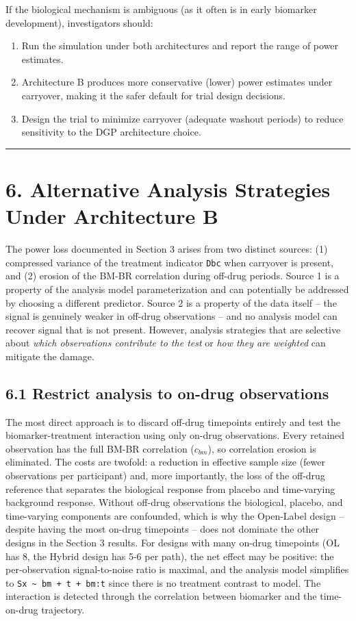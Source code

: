 \documentclass[
]{article}
\begin{document}
If the biological mechanism is ambiguous (as it often is in early
biomarker development), investigators should:

\begin{enumerate}
\item Run the simulation under both architectures and report the
  range of power estimates.
\item Architecture B produces more conservative (lower)
  power estimates under carryover, making it the safer default
  for trial design decisions.
\item Design the trial to minimize carryover (adequate washout
  periods) to reduce sensitivity to the DGP architecture choice.
\end{enumerate}

\bigskip\noindent

\rule{\textwidth}{0.4pt}\bigskip

\section{6. Alternative Analysis Strategies Under Architecture B}

The power loss documented in Section 3 arises from two distinct
sources: (1) compressed variance of the treatment indicator
\texttt{Dbc} when carryover is present, and (2) erosion of the
BM-BR correlation during off-drug periods. Source 1 is a
property of
the analysis model parameterization and can potentially be
addressed by choosing a different predictor. Source 2 is a
property of the data itself -- the signal is genuinely weaker in
off-drug observations -- and no analysis model can recover signal
that is not present. However, analysis strategies that are
selective about \textit{which observations contribute to the test} or
\textit{how they are weighted} can mitigate the damage.

\subsection{6.1 Restrict analysis to on-drug observations}

The most direct approach is to discard off-drug timepoints
entirely and test the biomarker-treatment interaction using only
on-drug observations. Every retained observation has the full
BM-BR correlation (\(c_{bm}\)), so correlation erosion is
eliminated. The costs are twofold: a reduction in effective
sample size (fewer observations per participant) and, more
importantly, the loss of the off-drug reference that separates
the biological response from placebo and time-varying
background response. Without off-drug observations the
biological, placebo, and time-varying components are confounded,
which is why the Open-Label design -- despite having the most
on-drug timepoints -- does not dominate the other designs in
the Section 3 results. For designs with many
on-drug timepoints (OL has 8, the Hybrid design has 5-6 per
path), the net effect may be positive: the per-observation
signal-to-noise ratio is maximal, and the analysis model
simplifies to \texttt{Sx \textasciitilde{} bm + t + bm:t} since there is no treatment
contrast to model. The interaction is detected through the
correlation between biomarker and the time-on-drug trajectory.
\end{document}
